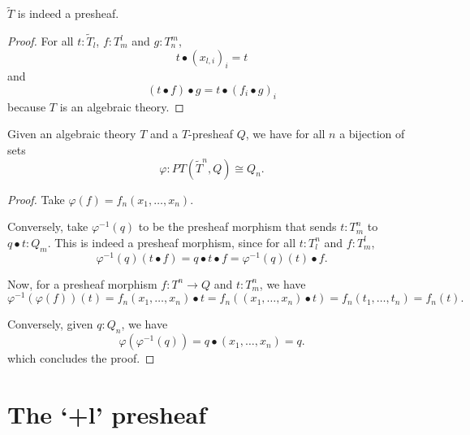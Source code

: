 \begin{lemma}
  $ \tilde T $ is indeed a presheaf.
\end{lemma}
\begin{proof}
  For all $ t: \tilde T_l $, $ f: T_m^l $ and $ g: T_n^m $,
  \[ t \bullet (x_{l, i})_i = t \]
  and
  \[ (t \bullet f) \bullet g = t \bullet (f_i \bullet g)_i \]
  because $ T $ is an algebraic theory.
\end{proof}

\begin{lemma}
  Given an algebraic theory $ T $ and a $ T $-presheaf $ Q $, we have for all $ n $ a bijection of sets
  \[ \varphi: PT(\tilde T^n, Q) \cong Q_n. \]
\end{lemma}
\begin{proof}
  Take $ \varphi(f) = f_n(x_1, \dots, x_n) $.

  Conversely, take $ \varphi^{-1}(q) $ to be the presheaf morphism that sends $ t: T^n_m $ to $ q \bullet t : Q_m $. This is indeed a presheaf morphism, since for all $ t: T^n_l $ and $ f: T^l_m $,
  \[ \varphi^{-1}(q)(t \bullet f) = q \bullet t \bullet f = \varphi^{-1}(q)(t) \bullet f. \]

  Now, for a presheaf morphism $ f: T^n \to Q $ and $ t: T^n_m $, we have
  \[ \varphi^{-1}(\varphi(f))(t) = f_n(x_1, \dots, x_n) \bullet t = f_n((x_1, \dots, x_n) \bullet t) = f_n(t_1, \dots, t_n) = f_n(t). \]

  Conversely, given $ q: Q_n $, we have
  \[ \varphi(\varphi^{-1}(q)) = q \bullet (x_1, \dots, x_n) = q. \]
  which concludes the proof.
\end{proof}

\section{The `+l' presheaf}


